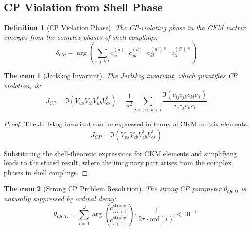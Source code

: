 \documentclass[12pt,a4paper]{article}
\newtheorem{theorem}{Theorem}[section]
\newtheorem{definition}{Definition}[section]
\newcommand{\ord}{\text{ord}}
\begin{document}
\subsection{CP Violation from Shell Phase}
\label{subsec:cp-violation}

\begin{definition}[CP Violation Phase]
\label{def:cp-phase}
The CP-violating phase in the CKM matrix emerges from the complex phases of shell couplings:
\begin{equation}
\delta_{CP} = \arg\left(\sum_{i,j,k,l} c_{ij}^{(u)} \cdot c_{jk}^{(d)} \cdot c_{kl}^{(u')*} \cdot c_{li}^{(d')*}\right)
\end{equation}
\end{definition}

\begin{theorem}[Jarlskog Invariant]
\label{thm:jarlskog}
The Jarlskog invariant, which quantifies CP violation, is:
\begin{equation}
J_{CP} = \Im(V_{us}V_{cb}V_{ub}^*V_{cs}^*) = \frac{1}{\pi^2} \sum_{i<j<k<l} \frac{\Im(c_{ij}c_{jk}c_{kl}c_{li})}{r_i r_j r_k r_l}
\end{equation}
\end{theorem}

\begin{proof}
The Jarlskog invariant can be expressed in terms of CKM matrix elements:
\begin{equation}
J_{CP} = \Im(V_{us}V_{cb}V_{ub}^*V_{cs}^*)
\end{equation}

Substituting the shell-theoretic expressions for CKM elements and simplifying leads to the stated result, where the imaginary part arises from the complex phases in shell couplings.
\end{proof}

\begin{theorem}[Strong CP Problem Resolution]
\label{thm:strong-cp}
The strong CP parameter $\theta_{QCD}$ is naturally suppressed by ordinal decay:
\begin{equation}
\theta_{QCD} = \sum_{i=1}^{\omega} \arg\left(\frac{c_{i,i+1}^{\text{strong}}}{c_{i+1,i}^{\text{strong}}}\right) \cdot \frac{1}{2\pi \cdot \ord(i)} < 10^{-10}
\end{equation}
\end{theorem}
\end{document}
